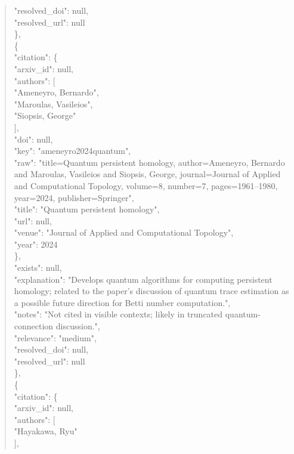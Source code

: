 \documentclass[11pt]{article}
\begin{document}
\begin{quote}
      "resolved\_doi": null,\\
      "resolved\_url": null\\
    \},\\
    \{\\
      "citation": \{\\
        "arxiv\_id": null,\\
        "authors": [\\
          "Ameneyro, Bernardo",\\
          "Maroulas, Vasileios",\\
          "Siopsis, George"\\
        ],\\
        "doi": null,\\
        "key": "ameneyro2024quantum",\\
        "raw": "title=Quantum persistent homology, author=Ameneyro, Bernardo and Maroulas, Vasileios and Siopsis, George, journal=Journal of Applied and Computational Topology, volume=8, number=7, pages=1961--1980, year=2024, publisher=Springer",\\
        "title": "Quantum persistent homology",\\
        "url": null,\\
        "venue": "Journal of Applied and Computational Topology",\\
        "year": 2024\\
      \},\\
      "exists": null,\\
      "explanation": "Develops quantum algorithms for computing persistent homology; related to the paper's discussion of quantum trace estimation as a possible future direction for Betti number computation.",\\
      "notes": "Not cited in visible contexts; likely in truncated quantum-connection discussion.",\\
      "relevance": "medium",\\
      "resolved\_doi": null,\\
      "resolved\_url": null\\
    \},\\
    \{\\
      "citation": \{\\
        "arxiv\_id": null,\\
        "authors": [\\
          "Hayakawa, Ryu"\\
        ],\\

\end{quote}
\end{document}
